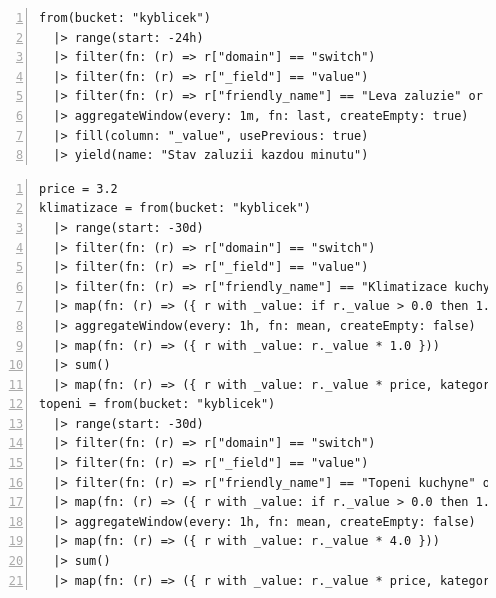 \pagebreak
\begin{lstlisting}[language=flux, breaklines=true, numbers=left, numberstyle=\small, numbersep=10pt, frame=single, basicstyle=\ttfamily\small, caption={Grafana - Spínání žaluzií}, label={lst:grafanaZaluzie}]
from(bucket: "kyblicek")
  |> range(start: -24h)
  |> filter(fn: (r) => r["domain"] == "switch")
  |> filter(fn: (r) => r["_field"] == "value")
  |> filter(fn: (r) => r["friendly_name"] == "Leva zaluzie" or r["friendly_name"] == "Prava zaluzie")
  |> aggregateWindow(every: 1m, fn: last, createEmpty: true)
  |> fill(column: "_value", usePrevious: true)
  |> yield(name: "Stav zaluzii kazdou minutu")
\end{lstlisting}
\begin{lstlisting}[language=flux, breaklines=true, numbers=left, numberstyle=\small, numbersep=10pt, frame=single, basicstyle=\ttfamily\small, caption={Grafana - Celkové měsíční náklady}, label={lst:grafanaCelkovyMesic}]
price = 3.2
klimatizace = from(bucket: "kyblicek")
  |> range(start: -30d)
  |> filter(fn: (r) => r["domain"] == "switch")
  |> filter(fn: (r) => r["_field"] == "value")
  |> filter(fn: (r) => r["friendly_name"] == "Klimatizace kuchyne" or r["friendly_name"] == "Klimatizace pracovna" or r["friendly_name"] == "Klimatizace u televize")
  |> map(fn: (r) => ({ r with _value: if r._value > 0.0 then 1.0 else 0.0 }))
  |> aggregateWindow(every: 1h, fn: mean, createEmpty: false)
  |> map(fn: (r) => ({ r with _value: r._value * 1.0 }))
  |> sum()
  |> map(fn: (r) => ({ r with _value: r._value * price, kategorie: "Klimatizace" }))
topeni = from(bucket: "kyblicek")
  |> range(start: -30d)
  |> filter(fn: (r) => r["domain"] == "switch")
  |> filter(fn: (r) => r["_field"] == "value")
  |> filter(fn: (r) => r["friendly_name"] == "Topeni kuchyne" or r["friendly_name"] == "Topeni pracovna" or r["friendly_name"] == "Topeni u televize")
  |> map(fn: (r) => ({ r with _value: if r._value > 0.0 then 1.0 else 0.0 }))
  |> aggregateWindow(every: 1h, fn: mean, createEmpty: false)
  |> map(fn: (r) => ({ r with _value: r._value * 4.0 }))
  |> sum()
  |> map(fn: (r) => ({ r with _value: r._value * price, kategorie: "Topeni" }))
\end{lstlisting}
\pagebreak
